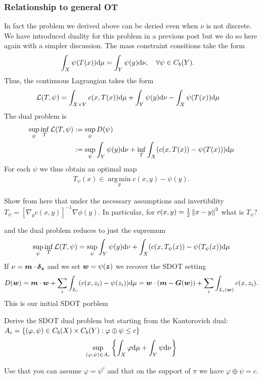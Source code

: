 \documentclass[
    a4paper,
    DIV=13,
    abstract=true,
    numbers=noenddot
]{scrartcl}
\begin{document}
\subsubsection{Relationship to general OT}
In fact the problem we derived above can be deried even when $\nu$ is not discrete. We have introduced duality for this problem in a previous post but we do so here again with a simpler discussion. The mass constraint consitions take the form 
\begin{align*}
  \int_{X }\psi(T(x)) \d \mu&= \int_{Y}\psi(y)\d \nu,\quad \forall \psi \in C_b(Y) .
\end{align*}
Thus, the continuous Lagrangian takes the form 
\begin{align*}
  \Ll(T,\psi)&=\int_{X \times Y}c(x,T(x))\d \mu+ \int_{Y}\psi(y)\d \nu-\int_{X }\psi(T(x)) \d  \mu
\end{align*}
The dual problem is 
\begin{align*}
\sup_\psi\inf_T \Ll(T,\psi) &:=\sup_{\psi}D(\psi)\\&:=\sup_{\psi}\int_{ Y}\psi(y) \d \nu+\inf_T\int_{X}(c(x,T(x))- \psi(T(x)))\d \mu\end{align*}
For each $\psi$ we thus obtain an optimal map 
\begin{align*}
    T_\psi(x)\in \operatorname*{arg\,min}_y c(x,y)- \psi(y).
\end{align*}
\begin{exercise}
  Show from here that under the necessary assumptions and invertibility $T_\psi= [\nabla_y c(x,y)]^{-1} \nabla\phi(y)$. In particular, for $c(x,y) = \frac{1}{2}\norm{x-y}^2$ what is $T_\psi$?
    \exerciseSymbol
\end{exercise}

and the dual problem reduces to just the supremum
\begin{align*}
    \sup_\psi\inf_T \Ll(T,\psi) =\sup_{\psi}\int_{ Y}\psi(y) \d \nu+\int_{X}(c(x,T_\psi(x))- \psi(T_\psi(x))\d \mu
\end{align*}
If  $\nu = \b{m} \cdot \b{\delta_z}$ and we set $\b{w}= \psi(\b{z})$ we recover the SDOT setting
\begin{align*}
  D(\b{w})=   \b{m}\cdot \b{w}+\sum_{i} \int_{L_i} (c(x,z_i)- \psi(z_i))\d \mu=\b{w}\cdot (\b{m}- \b{G}(\b{w}))+ \sum_{i} \int_{L_i(\b{w})} c(x,z_i).
\end{align*}
This is our initial SDOT porblem

\begin{exercise}
    Derive the SDOT dual problem but starting from the Kantorovich dual: $A_c= \set{(\varphi, \psi) \in C_b(X)\times C_b(Y):\varphi \oplus \psi \le c}$
    \begin{align*}
        \sups[(\varphi,\psi)\in A_c]{\int_{X}\varphi \d \mu+ \int_{Y}\psi \d \nu  }
    \end{align*}
    \exerciseSymbol
\end{exercise}
\begin{hint}
Use that you can assume $\varphi = \psi^c$ and that on the support of $\pi$ we have $\varphi \oplus \psi=c$.
\end{hint}
\end{document}
